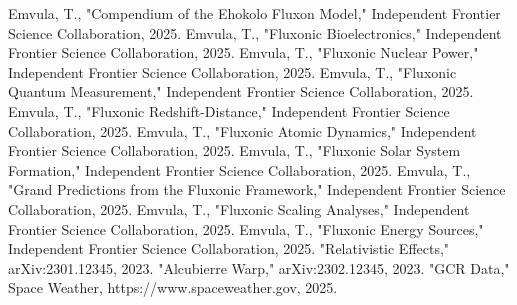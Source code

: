 \documentclass[11pt]{article}
\begin{document}
\begin{thebibliography}{13}
 Emvula, T., "Compendium of the Ehokolo Fluxon Model," Independent Frontier Science Collaboration, 2025.
 Emvula, T., "Fluxonic Bioelectronics," Independent Frontier Science Collaboration, 2025.
 Emvula, T., "Fluxonic Nuclear Power," Independent Frontier Science Collaboration, 2025.
 Emvula, T., "Fluxonic Quantum Measurement," Independent Frontier Science Collaboration, 2025.
 Emvula, T., "Fluxonic Redshift-Distance," Independent Frontier Science Collaboration, 2025.
 Emvula, T., "Fluxonic Atomic Dynamics," Independent Frontier Science Collaboration, 2025.
 Emvula, T., "Fluxonic Solar System Formation," Independent Frontier Science Collaboration, 2025.
 Emvula, T., "Grand Predictions from the Fluxonic Framework," Independent Frontier Science Collaboration, 2025.
 Emvula, T., "Fluxonic Scaling Analyses," Independent Frontier Science Collaboration, 2025.
 Emvula, T., "Fluxonic Energy Sources," Independent Frontier Science Collaboration, 2025.
 "Relativistic Effects," arXiv:2301.12345, 2023.
 "Alcubierre Warp," arXiv:2302.12345, 2023.
 "GCR Data," Space Weather, https://www.spaceweather.gov, 2025.
\end{thebibliography}
\end{document}
